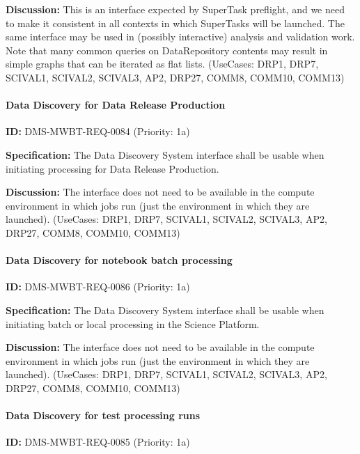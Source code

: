 \documentclass[SE,toc,lsstdraft]{lsstdoc}
\begin{document}
\textbf{Discussion:}
This is an interface expected by SuperTask preflight, and we need to make it consistent in all contexts in which SuperTasks will be launched. The same interface may be used in (possibly interactive) analysis and validation work. Note that many common queries on DataRepository contents may result in simple graphs that can be iterated as flat lists. (UseCases: DRP1, DRP7, SCIVAL1, SCIVAL2, SCIVAL3, AP2, DRP27, COMM8, COMM10, COMM13)

\paragraph{Data Discovery for Data Release Production}\hfill  %

\label{DMS-MWBT-REQ-0084}
\textbf{ID:} DMS-MWBT-REQ-0084 (Priority: 1a)

\textbf{Specification:}
The Data Discovery System interface shall be usable when initiating processing for Data Release Production.

\textbf{Discussion:}
The interface does not need to be available in the compute environment in which jobs run (just the environment in which they are launched). (UseCases: DRP1, DRP7, SCIVAL1, SCIVAL2, SCIVAL3, AP2, DRP27, COMM8, COMM10, COMM13)

\paragraph{Data Discovery for notebook batch processing}\hfill  %

\label{DMS-MWBT-REQ-0086}
\textbf{ID:} DMS-MWBT-REQ-0086 (Priority: 1a)

\textbf{Specification:}
The Data Discovery System interface shall be usable when initiating batch or local processing in the Science Platform.

\textbf{Discussion:}
The interface does not need to be available in the compute environment in which jobs run (just the environment in which they are launched). (UseCases: DRP1, DRP7, SCIVAL1, SCIVAL2, SCIVAL3, AP2, DRP27, COMM8, COMM10, COMM13)

\paragraph{Data Discovery for test processing runs}\hfill  %

\label{DMS-MWBT-REQ-0085}
\textbf{ID:} DMS-MWBT-REQ-0085 (Priority: 1a)
\end{document}
